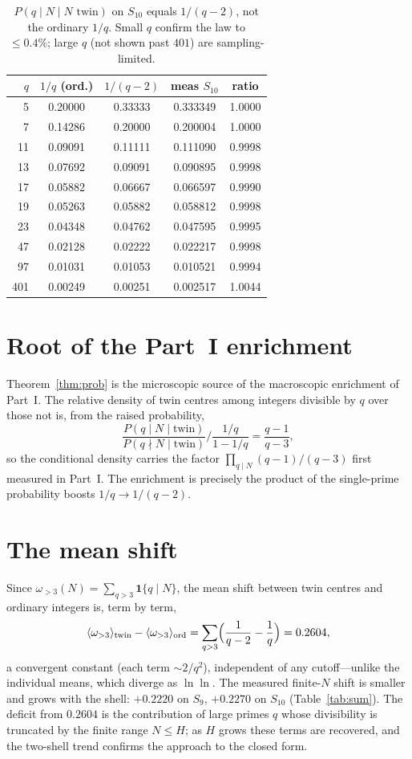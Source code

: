 \documentclass[11pt]{article}
\begin{document}
\begin{table}[h]\centering\small
\begin{tabular}{rcccc}
\toprule
$q$ & $1/q$ (ord.) & $1/(q-2)$ & meas $S_{10}$ & ratio\\
\midrule
5  & 0.20000 & 0.33333 & 0.333349 & 1.0000\\
7  & 0.14286 & 0.20000 & 0.200004 & 1.0000\\
11 & 0.09091 & 0.11111 & 0.111090 & 0.9998\\
13 & 0.07692 & 0.09091 & 0.090895 & 0.9998\\
17 & 0.05882 & 0.06667 & 0.066597 & 0.9990\\
19 & 0.05263 & 0.05882 & 0.058812 & 0.9998\\
23 & 0.04348 & 0.04762 & 0.047595 & 0.9995\\
47 & 0.02128 & 0.02222 & 0.022217 & 0.9998\\
97 & 0.01031 & 0.01053 & 0.010521 & 0.9994\\
401 & 0.00249 & 0.00251 & 0.002517 & 1.0044\\
\bottomrule
\end{tabular}
\caption{$P(q\mid N\mid N\text{ twin})$ on $S_{10}$ equals $1/(q-2)$, not the
ordinary $1/q$. Small $q$ confirm the law to $\le0.4\%$; large $q$ (not shown
past $401$) are sampling-limited.}
\label{tab:perq}
\end{table}

\section{Root of the Part~I enrichment}

Theorem~\ref{thm:prob} is the microscopic source of the macroscopic enrichment of
Part~I. The relative density of twin centres among integers divisible by $q$ over
those not is, from the raised probability,
\[
  \frac{P(q\mid N\mid\text{twin})}{P(q\nmid N\mid\text{twin})}\Big/
  \frac{1/q}{1-1/q}
  =\frac{q-1}{q-3},
\]
so the conditional density carries the factor $\prod_{q\mid N}(q-1)/(q-3)$ first
measured in Part~I. The enrichment is precisely the product of the single-prime
probability boosts $1/q\to1/(q-2)$.

\section{The mean shift}

Since $\omega_{>3}(N)=\sum_{q>3}\mathbf 1\{q\mid N\}$, the mean shift between twin
centres and ordinary integers is, term by term,
\[
  \langle\omega_{>3}\rangle_{\text{twin}}-\langle\omega_{>3}\rangle_{\text{ord}}
  =\sum_{q>3}\Bigl(\frac1{q-2}-\frac1q\Bigr)=0.2604,
\]
a convergent constant (each term $\sim 2/q^2$), independent of any cutoff---unlike
the individual means, which diverge as $\ln\ln$. The measured finite-$N$ shift is
smaller and grows with the shell: $+0.2220$ on $S_9$, $+0.2270$ on $S_{10}$
(Table~\ref{tab:sum}). The deficit from $0.2604$ is the contribution of large
primes $q$ whose divisibility is truncated by the finite range $N\le H$; as $H$
grows these terms are recovered, and the two-shell trend confirms the approach to
the closed form.
\end{document}
